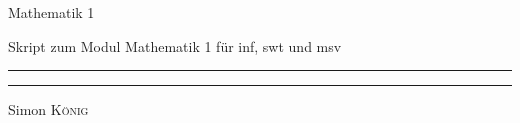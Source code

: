 \documentclass[a4paper, oneside]{report}
\begin{document}
\thispagestyle{empty}
\begin{center}
  
  \vspace{10em}
  {\Huge Mathematik 1}\\

  {\color{gray} Skript zum Modul Mathematik 1 für inf, swt und msv
  \color{darkgray}\rule{0.8\textwidth}{0.7pt}
  }


    \vfill


  {\tiny\color{darkgray}\rule{0.5\textwidth}{0.5pt}
  \vspace{0.5em}

  \small Simon \textsc{König}}
\end{center}

\tableofcontents



\end{document}
